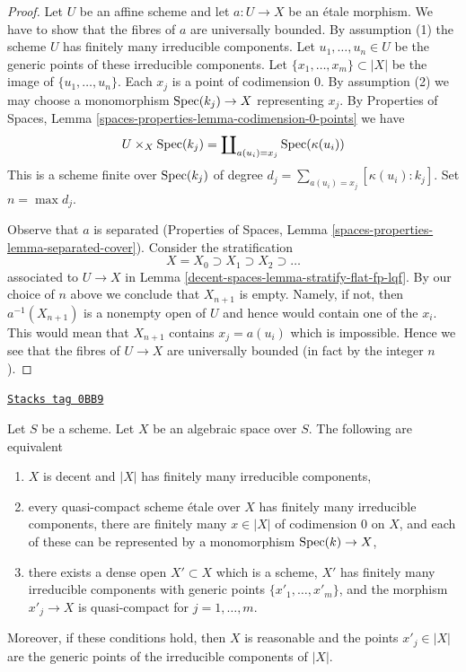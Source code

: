 \begin{proof}
Let $U$ be an affine scheme and let $a : U \to X$ be an \'etale morphism.
We have to show that the fibres of $a$ are universally bounded. By
assumption (1) the scheme $U$ has finitely many irreducible components.
Let $u_1, \ldots, u_n \in U$ be the generic points of these irreducible
components. Let $\{x_1, \ldots, x_m\} \subset |X|$ be the image
of $\{u_1, \ldots, u_n\}$. Each $x_j$ is a point of codimension $0$.
By assumption (2) we may choose a monomorphism $\operatorname{Spec}(k_j) \to X$
representing $x_j$. By Properties of Spaces, Lemma
\ref{spaces-properties-lemma-codimension-0-points} we have
$$
U \times_X \operatorname{Spec}(k_j) = \coprod\nolimits_{a(u_i) = x_j} \operatorname{Spec}(\kappa(u_i))
$$
This is a scheme finite over $\operatorname{Spec}(k_j)$ of degree
$d_j = \sum_{a(u_i) = x_j} [\kappa(u_i) : k_j]$. Set $n = \max d_j$.

\medskip\noindent
Observe that $a$ is separated
(Properties of Spaces, Lemma \ref{spaces-properties-lemma-separated-cover}).
Consider the stratification
$$
X = X_0 \supset X_1 \supset X_2 \supset \ldots
$$
associated to $U \to X$ in Lemma \ref{decent-spaces-lemma-stratify-flat-fp-lqf}.
By our choice of $n$ above we conclude that $X_{n + 1}$ is empty.
Namely, if not, then $a^{-1}(X_{n + 1})$ is a nonempty open
of $U$ and hence would contain one of the $x_i$. This would mean
that $X_{n + 1}$ contains $x_j = a(u_i)$ which is impossible.
Hence we see that the fibres of $U \to X$ are universally bounded
(in fact by the integer $n$).
\end{proof}

\begin{lemma}
\label{decent-spaces-lemma-finitely-many-irreducible-components}
\href{https://stacks.math.columbia.edu/tag/0BB9}{\texttt{Stacks tag 0BB9}}

Let $S$ be a scheme. Let $X$ be an algebraic space over $S$.
The following are equivalent
\begin{enumerate}
\item $X$ is decent and $|X|$ has finitely many irreducible components,
\item every quasi-compact scheme \'etale over $X$ has finitely many
irreducible components, there are finitely many $x \in |X|$ of
codimension $0$ on $X$, and each of these can be represented
by a monomorphism $\operatorname{Spec}(k) \to X$,
\item there exists a dense open $X' \subset X$ which is
a scheme, $X'$ has finitely many irreducible components
with generic points $\{x'_1, \ldots, x'_m\}$, and
the morphism $x'_j \to X$ is quasi-compact for $j = 1, \ldots, m$.
\end{enumerate}
Moreover, if these conditions hold, then $X$ is reasonable and the
points $x'_j \in |X|$ are the generic points of the irreducible
components of $|X|$.
\end{lemma}

